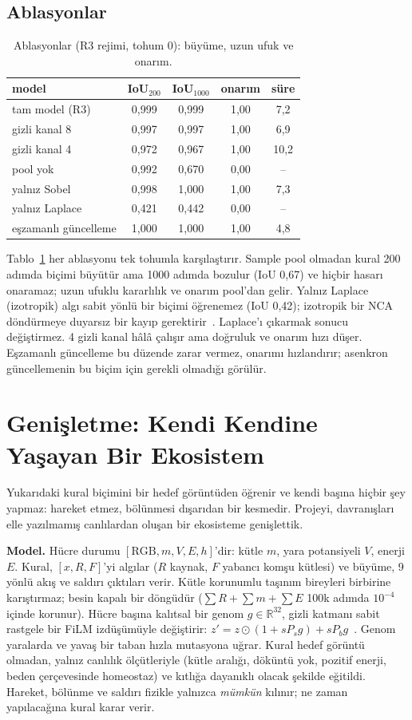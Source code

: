 \documentclass[conference]{IEEEtran}
\begin{document}
\subsection{Ablasyonlar}
\begin{table}[t]
\centering
\caption{Ablasyonlar (R3 rejimi, tohum 0): büyüme, uzun ufuk ve onarım.}
\label{tab:abl}
\begin{tabular}{lcccc}
\toprule
model & IoU$_{200}$ & IoU$_{1000}$ & onarım & süre \\
\midrule
tam model (R3) & 0,999 & 0,999 & 1,00 & 7,2 \\
gizli kanal 8 & 0,997 & 0,997 & 1,00 & 6,9 \\
gizli kanal 4 & 0,972 & 0,967 & 1,00 & 10,2 \\
pool yok & 0,992 & 0,670 & 0,00 & -- \\
yalnız Sobel & 0,998 & 1,000 & 1,00 & 7,3 \\
yalnız Laplace & 0,421 & 0,442 & 0,00 & -- \\
eşzamanlı güncelleme & 1,000 & 1,000 & 1,00 & 4,8 \\
\bottomrule
\end{tabular}
\end{table}
Tablo~\ref{tab:abl} her ablasyonu tek tohumla karşılaştırır. Sample pool olmadan kural 200 adımda biçimi büyütür ama 1000 adımda bozulur (IoU 0,67) ve hiçbir hasarı onaramaz; uzun ufuklu kararlılık ve onarım pool'dan gelir. Yalnız Laplace (izotropik) algı sabit yönlü bir biçimi öğrenemez (IoU 0,42); izotropik bir NCA döndürmeye duyarsız bir kayıp gerektirir~\cite{mordvintsev2022isotropic}. Laplace'ı çıkarmak sonucu değiştirmez. 4 gizli kanal hâlâ çalışır ama doğruluk ve onarım hızı düşer. Eşzamanlı güncelleme bu düzende zarar vermez, onarımı hızlandırır; asenkron güncellemenin bu biçim için gerekli olmadığı görülür.

\section{Genişletme: Kendi Kendine Yaşayan Bir Ekosistem}
Yukarıdaki kural biçimini bir hedef görüntüden öğrenir ve kendi başına hiçbir şey yapmaz: hareket etmez, bölünmesi dışarıdan bir kesmedir. Projeyi, davranışları elle yazılmamış canlılardan oluşan bir ekosisteme genişlettik.

\textbf{Model.} Hücre durumu $[\mathrm{RGB}, m, V, E, h]$'dir: kütle $m$, yara potansiyeli $V$, enerji $E$. Kural, $[x, R, F]$'yi algılar ($R$ kaynak, $F$ yabancı komşu kütlesi) ve büyüme, 9 yönlü akış ve saldırı çıktıları verir. Kütle korunumlu taşınım bireyleri birbirine karıştırmaz; besin kapalı bir döngüdür ($\sum R + \sum m + \sum E$ 100k adımda $10^{-4}$ içinde korunur). Hücre başına kalıtsal bir genom $g \in \mathbb{R}^{32}$, gizli katmanı sabit rastgele bir FiLM izdüşümüyle değiştirir: $z' = z \odot (1 + s P_s g) + s P_b g$~\cite{perez2018film,li2018intrinsic}. Genom yaralarda ve yavaş bir taban hızla mutasyona uğrar. Kural hedef görüntü olmadan, yalnız canlılık ölçütleriyle (kütle aralığı, döküntü yok, pozitif enerji, beden çerçevesinde homeostaz) ve kıtlığa dayanıklı olacak şekilde eğitildi. Hareket, bölünme ve saldırı fizikle yalnızca \emph{mümkün} kılınır; ne zaman yapılacağına kural karar verir.
\end{document}
